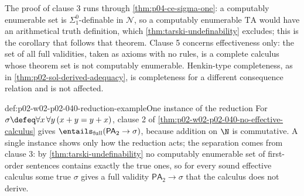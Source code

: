 The proof of clause 3 runs through \cref{thm:p04-ce-sigma-one}: a computably
enumerable set is \(\Sigma^0_1\)-definable in \(\mathcal N\), so a
computably enumerable \(\mathrm{TA}\) would have an arithmetical truth
definition, which \cref{thm:tarski-undefinability} excludes; this is the
corollary that follows that theorem.  Clause 5 concerns effectiveness only:
the set of all full validities, taken as axioms with no rules, is a
complete calculus whose theorem set is not computably enumerable.
Henkin-type completeness, as in \cref{thm:p02-sol-derived-adequacy}, is
completeness for a different consequence relation and is not affected.

\begin{hbexample}{def:p02-w02-p02-040-reduction-example}{One instance of the reduction}
For \(\sigma\defeq\forall x\,\forall y\,(x+y=y+x)\), clause 2 of
\cref{thm:p02-w02-p02-040-no-effective-calculus} gives
\(\entails_{\mathrm{full}}(\mathsf{PA}_2\to\sigma)\), because addition on
\(\N\) is commutative.  A single instance shows only how the reduction
acts; the separation comes from clause 3: by \cref{thm:tarski-undefinability} no
computably enumerable set of first-order sentences contains exactly the
true ones, so for every sound effective calculus some true \(\sigma\) gives
a full validity \(\mathsf{PA}_2\to\sigma\) that the calculus does not derive.
\end{hbexample}
